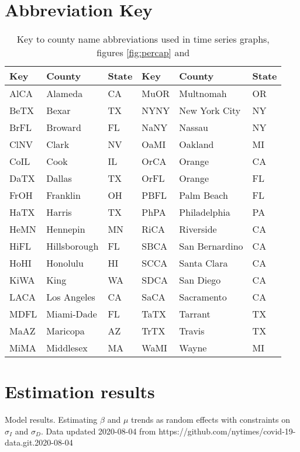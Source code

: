 \documentclass[12pt,letterpaper]{article}
\begin{document}
\begin{appendices}


\section{Abbreviation Key}

\begin{table}[h!]
\caption{\label{tab:namekey}
Key to county name abbreviations used in time series graphs, figures
\ref{fig:percap} and 
}
\centering
\begin{tabular}{lll||lll}
\hline
Key&County&State&Key&County&State\\
\hline
AlCA&Alameda&CA&MuOR&Multnomah&OR\\
BeTX&Bexar&TX&NYNY&New York City&NY\\
BrFL&Broward&FL&NaNY&Nassau&NY\\
ClNV&Clark&NV&OaMI&Oakland&MI\\
CoIL&Cook&IL&OrCA&Orange&CA\\
DaTX&Dallas&TX&OrFL&Orange&FL\\
FrOH&Franklin&OH&PBFL&Palm Beach&FL\\
HaTX&Harris&TX&PhPA&Philadelphia&PA\\
HeMN&Hennepin&MN&RiCA&Riverside&CA\\
HiFL&Hillsborough&FL&SBCA&San Bernardino&CA\\
HoHI&Honolulu&HI&SCCA&Santa Clara&CA\\
KiWA&King&WA&SDCA&San Diego&CA\\
LACA&Los Angeles&CA&SaCA&Sacramento&CA\\
MDFL&Miami-Dade&FL&TaTX&Tarrant&TX\\
MaAZ&Maricopa&AZ&TrTX&Travis&TX\\
MiMA&Middlesex&MA&WaMI&Wayne&MI\\
\hline
\end{tabular}

\end{table}
\clearpage

\section{Estimation results}

\begin{sidewaystable}
\caption{\label{tab:cons}
Model results. Estimating $\beta$ and $\mu$ trends as random effects with 
constraints on  $\sigma_I$ and $\sigma_D$. 
Data updated 2020-08-04 from https://github.com/nytimes/covid-19-data.git.2020-08-04
}
\centering
{\scriptsize


}
\end{sidewaystable}
\end{appendices}
\end{document}
